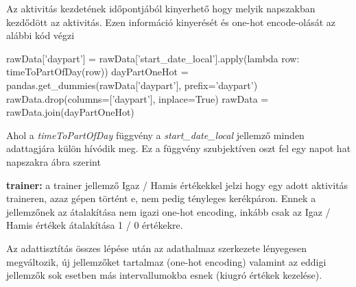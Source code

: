 \begin{programreszlet}
Az aktivitás kezdetének időpontjából kinyerhető hogy melyik napszakban kezdődött az aktivitás. Ezen információ kinyerését és one-hot encode-olását az alábbi kód végzi
\begin{python}
rawData['daypart'] = rawData['start_date_local'].apply(lambda row: 
						 timeToPartOfDay(row))
dayPartOneHot = pandas.get_dummies(rawData['daypart'], prefix='daypart')
rawData.drop(columns=['daypart'], inplace=True)
rawData = rawData.join(dayPartOneHot)
\end{python}	

Ahol a \textit{timeToPartOfDay} függvény a \textit{start\_date\_local} jellemző minden adattagjára külön hívódik meg. Ez a függvény szubjektíven oszt fel egy napot hat napszakra  ábra szerint

\end{programreszlet}



\textbf{trainer: } a trainer jellemző Igaz / Hamis értékekkel jelzi hogy egy adott aktivitás traineren, azaz gépen történt e, nem pedig tényleges kerékpáron. Ennek a jellemzőnek az átalakítása nem igazi one-hot encoding, inkább csak az Igaz / Hamis értékek átalakítása 1 / 0 értékekre.  


Az adattisztítás összes lépése után az adathalmaz szerkezete lényegesen megváltozik, új jellemzőket tartalmaz (one-hot encoding) valamint az eddigi jellemzők sok esetben más intervallumokba esnek (kiugró értékek kezelése).

